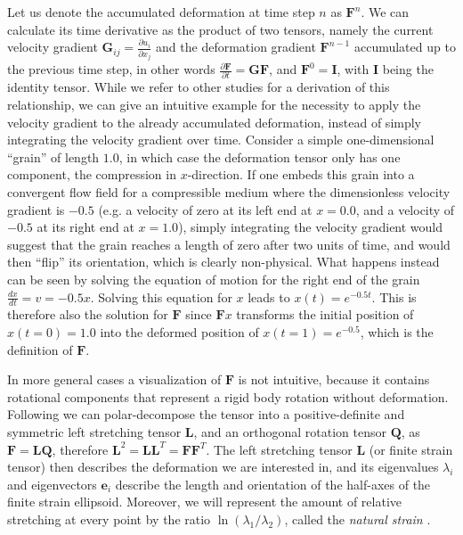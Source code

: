 \documentclass{article}
\begin{document}
Let us denote the accumulated deformation at time step $n$ as $\mathbf F^n$. We can calculate its time derivative
as the product of two tensors, namely the current velocity gradient $\mathbf G_{ij} = \frac{\partial u_i}{\partial x_j}$ and the deformation gradient $\mathbf F^{n-1}$ accumulated up to the previous time step, in other words $\frac{\partial \mathbf F}{\partial t} = \mathbf G \mathbf F$, and $\mathbf F^0 = \mathbf I$, with $\mathbf I$ being the identity tensor.
While we refer to other studies \cite{McKenzie1983, dahlen1998theoretical, Becker2003} for a derivation of
this relationship, we can give an intuitive example for the necessity to apply the velocity gradient to the already accumulated deformation, instead of simply integrating the velocity gradient over time. Consider a simple one-dimensional ``grain'' of length $1.0$, in which case the deformation tensor only has one component, the compression in $x$-direction. If one embeds this grain into a convergent flow field for a compressible medium where the dimensionless velocity gradient is $-0.5$  (e.g. a velocity of zero at its left end at $x=0.0$, and a velocity of $-0.5$ at its right end at $x=1.0$), simply integrating the velocity gradient would suggest that the grain reaches a length of zero after two units of time, and would then ``flip'' its orientation, which is clearly non-physical.
What happens instead can be seen by solving the equation of motion for the right end of the grain $\frac{dx}{dt} = v = -0.5 x$. Solving this equation for $x$ leads to $x(t) = e^{-0.5t}$. This is therefore also the solution for $\mathbf F$ since $\mathbf F x$ transforms the initial position of $x(t=0)=1.0$ into the deformed position of $x(t=1) = e^{-0.5}$, which is the definition of $\mathbf F$.

In more general cases a visualization of $\mathbf F$ is not intuitive, because it contains rotational components that represent a rigid body rotation without deformation. Following \cite{Becker2003} we can polar-decompose the tensor into a positive-definite and symmetric left stretching tensor $\mathbf L$, and an orthogonal rotation tensor $\mathbf Q$, as $\mathbf F = \mathbf L \mathbf Q$, therefore $\mathbf L^2 = \mathbf L \mathbf L^T = \mathbf F \mathbf F^T$. The left stretching tensor $\mathbf L$ (or finite strain tensor) then describes the deformation we are interested in, and its eigenvalues $\lambda_i$ and eigenvectors $\mathbf e_i$ describe the length and orientation of the half-axes of the finite strain ellipsoid. Moreover, we will represent the amount of relative stretching at every point by the ratio $\ln(\lambda_1/\lambda_2)$, called the \textit{natural strain} \cite{Ribe1992}.
\end{document}
